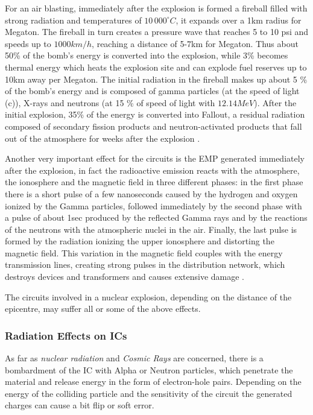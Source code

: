 {{{{{					For an air blasting, immediately after the explosion is formed a fireball filled with strong radiation and temperatures of $10\,000^\circ C$, it expands over a 1km radius for Megaton. The fireball in turn creates a pressure wave that reaches 5 to 10 psi and speeds up to $1000 km/h$, reaching a distance of 5-7km for Megaton. Thus about 50\% of the bomb's energy is converted into the explosion, while 3\% becomes thermal energy which heats the explosion site and can explode fuel reserves up to 10km away per Megaton. The initial radiation in the fireball makes up about 5 \% of the bomb's energy and is composed of gamma particles (at the speed of light (c)), X-rays and neutrons (at 15 \% of speed of light with $12.14MeV$). After the initial explosion, 35\% of the energy is converted into Fallout, a residual radiation composed of secondary fission products and neutron-activated products that fall out of the atmosphere for weeks after the explosion .
					
					Another very important effect for the circuits is the EMP generated immediately after the explosion, in fact the radioactive emission reacts with the atmosphere, the ionosphere and the magnetic field in three different phases: in the first phase there is a short pulse of a few nanoseconds caused by the hydrogen and oxygen ionized by the Gamma particles, followed immediately by the second phase with a pulse of about 1sec produced by the reflected Gamma rays and by the reactions of the neutrons with the atmospheric nuclei in the air. Finally, the last pulse is formed by the radiation ionizing the upper ionosphere and distorting the magnetic field. This variation in the magnetic field couples with the energy transmission lines, creating strong pulses in the distribution network, which destroys devices and transformers and causes extensive damage .
					
					The circuits involved in a nuclear explosion, depending on the distance of the epicentre, may suffer all or some of the above effects.
				}%
			
			}%
		
		
			\subsubsection{Radiation Effects on ICs}{
				As far as \textit{nuclear radiation} and \textit{Cosmic Rays} are concerned, there is a bombardment of the IC with Alpha or Neutron particles, which penetrate the material and release energy in the form of electron-hole pairs. Depending on the energy of the colliding particle and the sensitivity of the circuit the generated charges can cause a bit flip or soft error. 
				
}}}}
